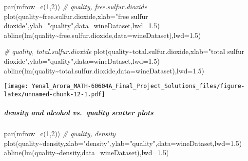\documentclass[
]{article}
\newenvironment{Shaded}{\begin{snugshade}}{\end{snugshade}}
\newcommand{\AttributeTok}[1]{\textcolor[rgb]{0.77,0.63,0.00}{#1}}
\newcommand{\CommentTok}[1]{\textcolor[rgb]{0.56,0.35,0.01}{\textit{#1}}}
\newcommand{\DecValTok}[1]{\textcolor[rgb]{0.00,0.00,0.81}{#1}}
\newcommand{\FloatTok}[1]{\textcolor[rgb]{0.00,0.00,0.81}{#1}}
\newcommand{\FunctionTok}[1]{\textcolor[rgb]{0.00,0.00,0.00}{#1}}
\newcommand{\NormalTok}[1]{#1}
\newcommand{\SpecialCharTok}[1]{\textcolor[rgb]{0.00,0.00,0.00}{#1}}
\newcommand{\StringTok}[1]{\textcolor[rgb]{0.31,0.60,0.02}{#1}}
\begin{document}
\begin{Shaded}
\begin{Highlighting}[]
\FunctionTok{par}\NormalTok{(}\AttributeTok{mfrow=}\FunctionTok{c}\NormalTok{(}\DecValTok{1}\NormalTok{,}\DecValTok{2}\NormalTok{))}
\CommentTok{\# quality, free.sulfur.dioxide}
\FunctionTok{plot}\NormalTok{(quality}\SpecialCharTok{\textasciitilde{}}\NormalTok{free.sulfur.dioxide,}\AttributeTok{xlab=}\StringTok{"free sulfur dioxide"}\NormalTok{,}\AttributeTok{ylab=}\StringTok{"quality"}\NormalTok{,}\AttributeTok{data=}\NormalTok{wineDataset,}\AttributeTok{lwd=}\FloatTok{1.5}\NormalTok{)}
\FunctionTok{abline}\NormalTok{(}\FunctionTok{lm}\NormalTok{(quality}\SpecialCharTok{\textasciitilde{}}\NormalTok{free.sulfur.dioxide,}\AttributeTok{data=}\NormalTok{wineDataset),}\AttributeTok{lwd=}\FloatTok{1.5}\NormalTok{)}

\CommentTok{\# quality, total.sulfur.dioxide}
\FunctionTok{plot}\NormalTok{(quality}\SpecialCharTok{\textasciitilde{}}\NormalTok{total.sulfur.dioxide,}\AttributeTok{xlab=}\StringTok{"total sulfur dioxide"}\NormalTok{,}\AttributeTok{ylab=}\StringTok{"quality"}\NormalTok{,}\AttributeTok{data=}\NormalTok{wineDataset,}\AttributeTok{lwd=}\FloatTok{1.5}\NormalTok{)}
\FunctionTok{abline}\NormalTok{(}\FunctionTok{lm}\NormalTok{(quality}\SpecialCharTok{\textasciitilde{}}\NormalTok{total.sulfur.dioxide,}\AttributeTok{data=}\NormalTok{wineDataset),}\AttributeTok{lwd=}\FloatTok{1.5}\NormalTok{)}
\end{Highlighting}
\end{Shaded}

\texttt{[image: Yenal\_Arora\_MATH-60604A\_Final\_Project\_Solutions\_files/figure-latex/unnamed-chunk-12-1.pdf]}

\hypertarget{density-and-alcohol-vs.-quality-scatter-plots}{%
\subparagraph{density and alcohol vs.~quality scatter
plots}\label{density-and-alcohol-vs.-quality-scatter-plots}}

\begin{Shaded}
\begin{Highlighting}[]
\FunctionTok{par}\NormalTok{(}\AttributeTok{mfrow=}\FunctionTok{c}\NormalTok{(}\DecValTok{1}\NormalTok{,}\DecValTok{2}\NormalTok{))}
\CommentTok{\# quality, density}
\FunctionTok{plot}\NormalTok{(quality}\SpecialCharTok{\textasciitilde{}}\NormalTok{density,}\AttributeTok{xlab=}\StringTok{"density"}\NormalTok{,}\AttributeTok{ylab=}\StringTok{"quality"}\NormalTok{,}\AttributeTok{data=}\NormalTok{wineDataset,}\AttributeTok{lwd=}\FloatTok{1.5}\NormalTok{)}
\FunctionTok{abline}\NormalTok{(}\FunctionTok{lm}\NormalTok{(quality}\SpecialCharTok{\textasciitilde{}}\NormalTok{density,}\AttributeTok{data=}\NormalTok{wineDataset),}\AttributeTok{lwd=}\FloatTok{1.5}\NormalTok{)}
\end{Highlighting}
\end{Shaded}
\end{document}
